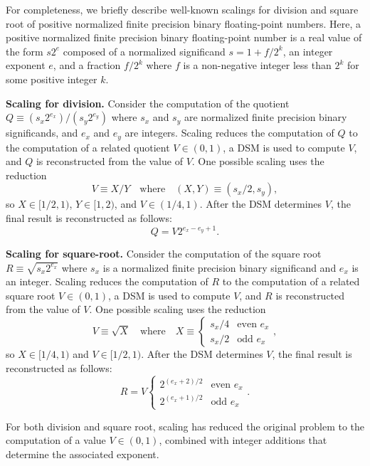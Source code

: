 \documentclass[10pt]{article}
\theoremstyle{definition}
\theoremstyle{remark}
\numberwithin{equation}{section}
\newcommand{\lead}[1]{\par\medskip\noindent\textbf{#1.}}
\begin{document}
For completeness, we briefly describe well-known scalings for division and square root of positive normalized finite precision binary floating-point numbers. Here, a positive normalized finite precision binary floating-point number is a real value of the form $s 2^e$ composed of a normalized significand $s = 1 + f/2^k$, an integer exponent $e$, and a fraction $f/2^k$ where $f$ is a non-negative integer less than $2^k$ for some positive integer $k$.

\lead{Scaling for division} Consider the computation of the quotient $Q \equiv (s_x 2^{e_x})/(s_y 2^{e_y})$ where $s_x$ and $s_y$ are normalized finite precision binary significands, and $e_x$ and $e_y$ are integers.
Scaling reduces the computation of $Q$ to the computation of a related quotient $V \in (0,1)$, a DSM is used to compute $V$, and $Q$ is reconstructed from the value of $V$.
One possible scaling uses the reduction
\[
V \equiv X/Y  \quad\text{where}\quad  (X,Y) \equiv (s_x/2, s_y) ,
\]
so $X \in [1/2,1)$, $Y \in [1,2)$, and $V \in (1/4,1)$. 
After the DSM determines $V$, the final result is reconstructed as follows:
\[
Q = V  2^{e_x - e_y + 1} .
\]

\lead{Scaling for square-root} Consider the computation of the square root $R \equiv \sqrt{s_x 2^{e_x}}$ where $s_x$ is a normalized finite precision binary significand and $e_x$ is an integer.
Scaling reduces the computation of $R$ to the computation of a related square root $V \in (0,1)$, a DSM is used to compute $V$, and $R$ is reconstructed from the value of $V$.
One possible scaling uses the reduction 
\[
V \equiv \sqrt{X} \quad\text{where}\quad
X \equiv \begin{cases*}
s_x/4 & \text{even $e_x$} \\
s_x/2 & \text{odd $e_x$}
\end{cases*},
\]
so $X \in [1/4,1)$ and $V \in [1/2,1)$.
After the DSM determines $V$, the final result is reconstructed as follows:
\[
R = V  \begin{cases*}
			2^{(e_x+2)/2} & \text{even $e_x$} \\
			2^{(e_x+1)/2} & \text{odd $e_x$} 
		 \end{cases*} .
\]

For both division and square root, scaling has reduced the original problem to the computation of a value $V \in (0,1)$, combined with
integer additions that determine the associated exponent.

\end{document}
